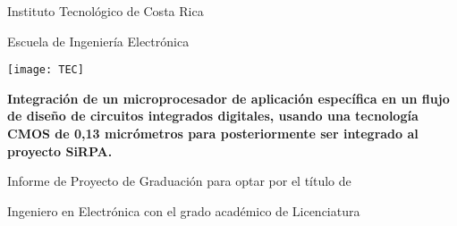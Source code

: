 
\thispagestyle{empty} 

\begin{center}

Instituto Tecnológico de Costa Rica

\par\vspace{1ex}

Escuela de Ingeniería Electrónica

\par\vspace{20mm}

\texttt{[image: TEC]}

\par\vspace*{\fill}

{\large\bf{Integración de un microprocesador de aplicación específica en un flujo de diseño de circuitos integrados digitales, usando una tecnología CMOS de 0,13 micrómetros para posteriormente ser integrado al proyecto SiRPA.}}

\par\vspace*{\fill}

Informe de Proyecto de Graduación para optar por el título de

Ingeniero en Electrónica con el grado académico de Licenciatura

\par\vspace{20mm}

\scriptAuthor

\vspace*{\fill}

\end{center}
\newpage 
\cleardoublepage 


